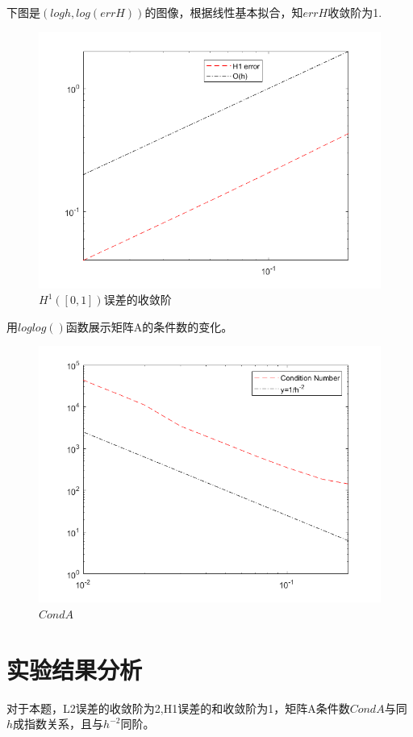 \documentclass{ctexart}
\begin{document}
\newpage
下图是$(logh,log(errH))$的图像，根据线性基本拟合，知$errH$收敛阶为1.
\begin{figure}[H]
\centering
\includegraphics[scale=0.5]{errH1.png}
\caption{\label{H1_err}$H^{1}([0,1])$误差的收敛阶}
\end{figure}



用$loglog()$函数展示矩阵A的条件数的变化。
\begin{figure}[H]
\centering
\includegraphics[scale=0.5]{CondA.png}
\caption{\label{CondA}$CondA$}
\end{figure}


\section{实验结果分析}
对于本题，L2误差的收敛阶为2,H1误差的和收敛阶为1，矩阵A条件数$CondA$与同$h$成指数关系，且与$h^{-2}$同阶。
\end{document}
